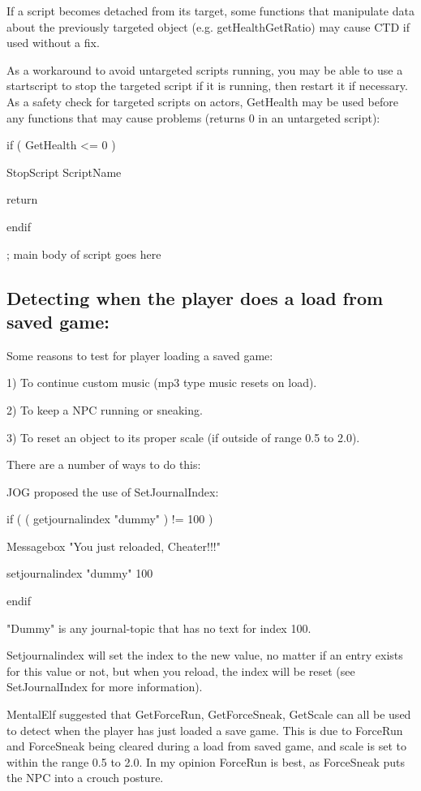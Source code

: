 \documentclass[
]{article}
\begin{document}
If a script becomes detached from its target, some functions that
manipulate data about the previously targeted object (e.g.
getHealthGetRatio) may cause CTD if used without a fix.

As a workaround to avoid untargeted scripts running, you may be able to
use a startscript to stop the targeted script if it is running, then
restart it if necessary. As a safety check for targeted scripts on
actors, GetHealth may be used before any functions that may cause
problems (returns 0 in an untargeted script):

if ( GetHealth \textless= 0 )

StopScript ScriptName

return

endif

; main body of script goes here

\hypertarget{detecting-when-the-player-does-a-load-from-saved-game}{%
\subsection{Detecting when the player does a load from saved
game:}\label{detecting-when-the-player-does-a-load-from-saved-game}}

Some reasons to test for player loading a saved game:

1) To continue custom music (mp3 type music resets on load).

2) To keep a NPC running or sneaking.

3) To reset an object to its proper scale (if outside of range 0.5 to
2.0).

There are a number of ways to do this:

JOG proposed the use of SetJournalIndex:

if ( ( getjournalindex "dummy" ) != 100 )

Messagebox "You just reloaded, Cheater!!!"

setjournalindex "dummy" 100

endif

"Dummy" is any journal-topic that has no text for index 100.

Setjournalindex will set the index to the new value, no matter if an
entry exists for this value or not, but when you reload, the index will
be reset (see SetJournalIndex for more information).

MentalElf suggested that GetForceRun, GetForceSneak, GetScale can all be
used to detect when the player has just loaded a save game. This is due
to ForceRun and ForceSneak being cleared during a load from saved game,
and scale is set to within the range 0.5 to 2.0. In my opinion ForceRun
is best, as ForceSneak puts the NPC into a crouch posture.
\end{document}
